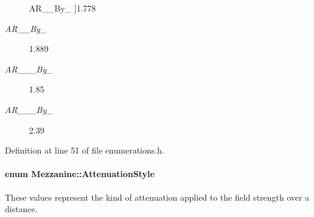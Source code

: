 \begin{Desc}
\begin{description}
{\hypertarget{namespaceMezzanine_a4f14cccd98d1bdc1bf934c1c028e3eafabd1801766c3dd81470e785a604fb8db2}{
AR\_\_\-By\_}
\label{namespaceMezzanine_a4f14cccd98d1bdc1bf934c1c028e3eafabd1801766c3dd81470e785a604fb8db2}
}]1.778 \item[{\em 
\hypertarget{namespaceMezzanine_a4f14cccd98d1bdc1bf934c1c028e3eafa037068693e5a954da062e4f6122d1ad7}{
AR\_\-17\_\-By\_\-9}
\label{namespaceMezzanine_a4f14cccd98d1bdc1bf934c1c028e3eafa037068693e5a954da062e4f6122d1ad7}
}]1.889 \item[{\em 
\hypertarget{namespaceMezzanine_a4f14cccd98d1bdc1bf934c1c028e3eafa14073edea666339eb6fdaa3ca23e946d}{
AR\_\-1\_\-85\_\-By\_\-1}
\label{namespaceMezzanine_a4f14cccd98d1bdc1bf934c1c028e3eafa14073edea666339eb6fdaa3ca23e946d}
}]1.85 \item[{\em 
\hypertarget{namespaceMezzanine_a4f14cccd98d1bdc1bf934c1c028e3eafaa95e86e3db402a75a3de756247da4b29}{
AR\_\-2\_\-39\_\-By\_\-1}
\label{namespaceMezzanine_a4f14cccd98d1bdc1bf934c1c028e3eafaa95e86e3db402a75a3de756247da4b29}
}]2.39 \end{description}
\end{Desc}



Definition at line 51 of file enumerations.h.

\hypertarget{namespaceMezzanine_a2d10a79e11a2031df10af540eede12fa}{
\paragraph[{AttenuationStyle}]{\setlength{\rightskip}{0pt plus 5cm}enum {\bf Mezzanine::AttenuationStyle}}\hfill}
\label{namespaceMezzanine_a2d10a79e11a2031df10af540eede12fa}


These values represent the kind of attenuation applied to the field strength over a distance. 

